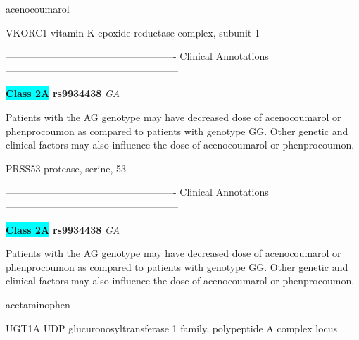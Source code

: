 \documentclass{resume} %
\begin{document}
\begin{rSection}{ acenocoumarol }
\begin{rSubsection}{ VKORC1 }{ vitamin K epoxide reductase complex, subunit 1 }{}{}
\item[] ---------------------------------------------------- Clinical Annotations -----------------------------------------------------\newline
\item \textbf{\colorbox{cyan} {Class 2A}} \textbf{ rs9934438 } \textit{ GA }
\item[] Patients with the AG genotype may have decreased dose of acenocoumarol or phenprocoumon as compared to patients with genotype GG. Other genetic and clinical factors may also influence the dose of acenocoumarol or phenprocoumon.
\end{rSubsection}\begin{rSubsection}{ PRSS53 }{ protease, serine, 53 }{}{}
\item[]

\item[] ---------------------------------------------------- Clinical Annotations -----------------------------------------------------\newline
\item \textbf{\colorbox{cyan} {Class 2A}} \textbf{ rs9934438 } \textit{ GA }
\item[] Patients with the AG genotype may have decreased dose of acenocoumarol or phenprocoumon as compared to patients with genotype GG. Other genetic and clinical factors may also influence the dose of acenocoumarol or phenprocoumon.
\end{rSubsection}

\end{rSection}\begin{rSection}{ acetaminophen }
\item[]

\begin{rSubsection}{ UGT1A }{ UDP glucuronosyltransferase 1 family, polypeptide A complex locus }{}{}
\item[]


\end{rSubsection}
\end{rSection}
\end{document}
